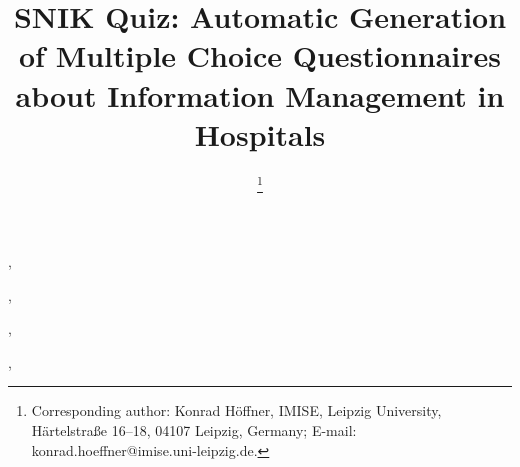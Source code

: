 \documentclass{IOS-Book-Article}     %
\def\hb{\hbox to 11.5 cm{}}
\begin{document}
\pagestyle{headings}
\def\thepage{}

\begin{frontmatter}              %


\title{SNIK Quiz: Automatic Generation of Multiple Choice Questionnaires about Information Management in Hospitals}

\markboth{}{May 2022\hb}

\author[A]{ %
\thanks{Corresponding author: Konrad Höffner, IMISE, Leipzig University,
Härtelstraße 16--18, 04107 Leipzig, Germany; E-mail: konrad.hoeffner@imise.uni-leipzig.de.}},
\author[A]{ },
\author[A]{ },
\author[A]{ },
\author[A]{ }
\address[A]{IMISE, Leipzig University, Germany}


\end{frontmatter}
\end{document}
